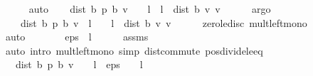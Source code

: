 \begin{isabellebody}
\ \ \ \ \isamarkupfalse%
\ auto\isanewline
\ \ \isamarkupfalse%
\ {\isachardoublequoteopen}dist\ {\isacharparenleft}{\kern0pt}{\isasymnu}\isactrlsub b\ {\isacharquery}{\kern0pt}p{\isacharparenright}{\kern0pt}\ {\isacharparenleft}{\kern0pt}{\isasymL}\isactrlsub b\ v{\isacharparenright}{\kern0pt}\ {\isacharasterisk}{\kern0pt}\ {\isacharparenleft}{\kern0pt}{}\ {\isacharminus}{\kern0pt}\ l{\isacharparenright}{\kern0pt}\ {\isasymle}\ l\ {\isacharasterisk}{\kern0pt}\ dist\ {\isacharparenleft}{\kern0pt}{\isasymL}\isactrlsub b\ v{\isacharparenright}{\kern0pt}\ v{\isachardoublequoteclose}\isanewline
\ \ \ \ \isamarkupfalse%
\ argo\isanewline
\ \ \isamarkupfalse%
\ \ {\isachardoublequoteopen}{}\ {\isacharasterisk}{\kern0pt}\ dist\ {\isacharparenleft}{\kern0pt}{\isasymnu}\isactrlsub b\ {\isacharquery}{\kern0pt}p{\isacharparenright}{\kern0pt}\ {\isacharparenleft}{\kern0pt}{\isasymL}\isactrlsub b\ v{\isacharparenright}{\kern0pt}\ {\isacharasterisk}{\kern0pt}\ {\isacharparenleft}{\kern0pt}{}{\isacharminus}{\kern0pt}l{\isacharparenright}{\kern0pt}\ {\isasymle}\ {}\ {\isacharasterisk}{\kern0pt}\ {\isacharparenleft}{\kern0pt}l\ {\isacharasterisk}{\kern0pt}\ dist\ {\isacharparenleft}{\kern0pt}{\isasymL}\isactrlsub b\ v{\isacharparenright}{\kern0pt}\ v{\isacharparenright}{\kern0pt}{\isachardoublequoteclose}\isanewline
\ \ \ \ \isamarkupfalse%
\ zero{\isacharunderscore}{\kern0pt}le{\isacharunderscore}{\kern0pt}disc\ mult{\isacharunderscore}{\kern0pt}left{\isacharunderscore}{\kern0pt}mono\ \isanewline
\ \ \ \ \isamarkupfalse%
\ auto\isanewline
\ \ \isamarkupfalse%
\ \isamarkupfalse%
\ {\isachardoublequoteopen}{\isasymdots}\ {\isasymle}\ eps\ {\isacharasterisk}{\kern0pt}\ {\isacharparenleft}{\kern0pt}{}{\isacharminus}{\kern0pt}l{\isacharparenright}{\kern0pt}{\isachardoublequoteclose}\isanewline
\ \ \ \ \isamarkupfalse%
\ assms\isanewline
\ \ \ \ \isamarkupfalse%
\ {\isacharparenleft}{\kern0pt}auto\ intro{\isacharbang}{\kern0pt}{\isacharcolon}{\kern0pt}\ mult{\isacharunderscore}{\kern0pt}left{\isacharunderscore}{\kern0pt}mono\ simp{\isacharcolon}{\kern0pt}\ dist{\isacharunderscore}{\kern0pt}commute\ pos{\isacharunderscore}{\kern0pt}divide{\isacharunderscore}{\kern0pt}le{\isacharunderscore}{\kern0pt}eq{\isacharparenright}{\kern0pt}\isanewline
\ \ \isamarkupfalse%
\ \isamarkupfalse%
\ {\isachardoublequoteopen}{}\ {\isacharasterisk}{\kern0pt}\ dist\ {\isacharparenleft}{\kern0pt}{\isasymnu}\isactrlsub b\ {\isacharquery}{\kern0pt}p{\isacharparenright}{\kern0pt}\ {\isacharparenleft}{\kern0pt}{\isasymL}\isactrlsub b\ v{\isacharparenright}{\kern0pt}\ {\isacharasterisk}{\kern0pt}\ {\isacharparenleft}{\kern0pt}{}\ {\isacharminus}{\kern0pt}\ l{\isacharparenright}{\kern0pt}\ {\isasymle}\ eps\ {\isacharasterisk}{\kern0pt}\ {\isacharparenleft}{\kern0pt}{}\ {\isacharminus}{\kern0pt}\ l{\isacharparenright}{\kern0pt}{\isachardoublequoteclose}\isacommand{{\isachardot}{\kern0pt}}\isamarkupfalse%

\end{isabellebody}
